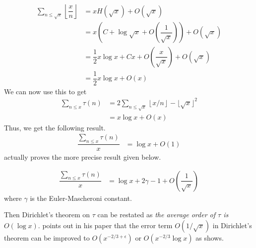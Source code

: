 \documentclass[elemannt.tex]{subfile}
\begin{document}
		\begin{align*}
			\sum_{n\leq \sqrt{x}}\left\lfloor{\dfrac{x}{n}}\right\rfloor
				& = xH(\sqrt{x})+O(\sqrt{x})\\
				& = x\left(C+\log{\sqrt{x}}+O\left(\dfrac{1}{\sqrt{x}}\right)\right)+O(\sqrt{x})\\
				& = \dfrac{1}{2}x\log{x}+Cx+O\left(\dfrac{x}{\sqrt{x}}\right)+O(\sqrt{x})\\
				& = \dfrac{1}{2}x\log{x}+O(x)
		\end{align*}
	We can now use this to get
		\begin{align*}
			\sum_{n\leq x}\tau(n)
				& = 2\sum_{n\leq \sqrt{x}}\left\lfloor{x/n}\right\rfloor-\lfloor{\sqrt{x}}\rfloor^{2}\\
				& = x\log{x}+O(x)
		\end{align*}
	Thus, we get the following result.
		\begin{align*}
			\dfrac{\sum_{n\leq x}\tau(n)}{x}
				& = \log{x}+O(1)
		\end{align*}
	\textcite{dirichlet_1897} actually proves the more precise result given below.
		\begin{theorem}\label{thm:dirtau}
				\begin{align*}
					\dfrac{\sum_{n\leq x}\tau(n)}{x}
						& = \log{x}+2\gamma-1+O\left(\dfrac{1}{\sqrt{x}}\right)
				\end{align*}
			where $\gamma$ is the Euler-Mascheroni constant.
		\end{theorem}
	Then Dirichlet's theorem on $\tau$ can be restated as \textit{the average order of $\tau$ is }$O(\log{x})$. \textcite{aiyangar_hardy_vennkatesvara_seshu_aiyar_p_wilson_1927} points out in his paper that the error term $O(1/\sqrt{x})$ in Dirichlet's theorem can be improved to $O\left(x^{-2/3+\epsilon}\right)$ or $O\left(x^{-2/3}\log{x}\right)$ as \textcite[Page $689$]{landau_1912} shows.
	
\end{document}
